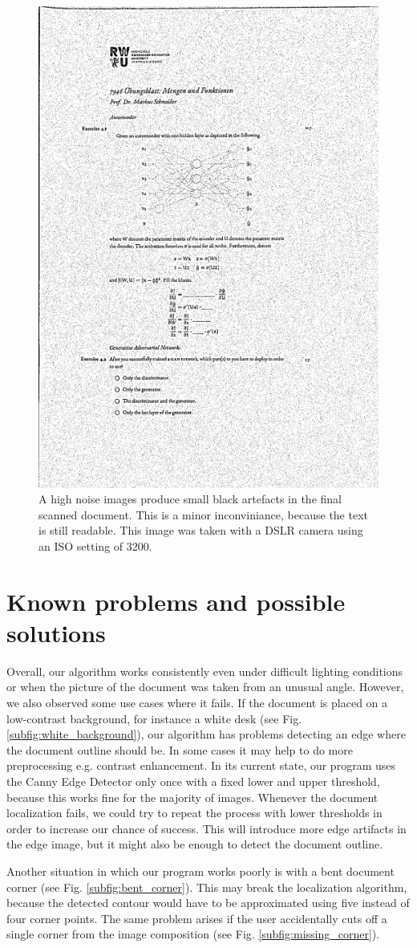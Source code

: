 \documentclass[bibliography=totoc]{scrartcl}
\begin{document}
\begin{figure}[H]
	\centering
	\includegraphics[width=0.3\linewidth]{imgs/threshold/noise.jpg}
	\caption{A high noise images produce small black artefacts in the final scanned document. This is a minor inconviniance, because the text is still readable. This image was taken with a \acs{DSLR} camera using an ISO setting of 3200.}
	\label{fig:noise}
\end{figure}

\section{Known problems and possible solutions}

Overall, our algorithm works consistently even under difficult lighting conditions or when the picture of the document was taken from an unusual angle.
However, we also observed some use cases where it fails.
If the document is placed on a low-contrast background, for instance a white desk (see Fig. \ref{subfig:white_background}), our algorithm has problems detecting an edge where the document outline should be.
In some cases it may help to do more preprocessing e.g. contrast enhancement.
In its current state, our program uses the Canny Edge Detector only once with a fixed lower and upper threshold, because this works fine for the majority of images.
Whenever the document localization fails, we could try to repeat the process with lower thresholds in order to increase our chance of success.
This will introduce more edge artifacts in the edge image, but it might also be enough to detect the document outline.

Another situation in which our program works poorly is with a bent document corner (see Fig. \ref{subfig:bent_corner}).
This may break the localization algorithm, because the detected contour would have to be approximated using five instead of four corner points.
The same problem arises if the user accidentally cuts off a single corner from the image composition (see Fig. \ref{subfig:missing_corner}).
\end{document}
